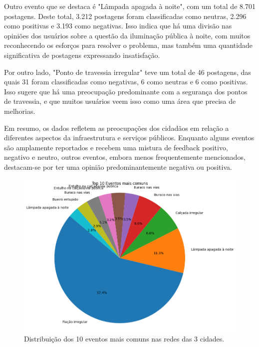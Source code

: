 Outro evento que se destaca é "Lâmpada apagada à noite", com um total de 8.701 postagens. Deste total, 3.212 postagens foram classificadas como neutras, 2.296 como positivas e 3.193 como negativas. Isso indica que há uma divisão nas opiniões dos usuários sobre a questão da iluminação pública à noite, com muitos reconhecendo os esforços para resolver o problema, mas também uma quantidade significativa de postagens expressando insatisfação.

Por outro lado, "Ponto de travessia irregular" teve um total de 46 postagens, das quais 31 foram classificadas como negativas, 6 como neutras e 6 como positivas. Isso sugere que há uma preocupação predominante com a segurança dos pontos de travessia, e que muitos usuários veem isso como uma área que precisa de melhorias.

Em resumo, os dados refletem as preocupações dos cidadãos em relação a diferentes aspectos da infraestrutura e serviços públicos. Enquanto alguns eventos são amplamente reportados e recebem uma mistura de feedback positivo, negativo e neutro, outros eventos, embora menos frequentemente mencionados, destacam-se por ter uma opinião predominantemente negativa ou positiva.

\begin{figure}[!htb]
	\caption{Distribuição dos 10 eventos mais comuns nas redes das 3 cidades.}
	\label{fig:pie_most_common_events}
	\centering
	\includegraphics[scale=0.65]{images/pie_most_common_events.png}
	\fautor
\end{figure}


